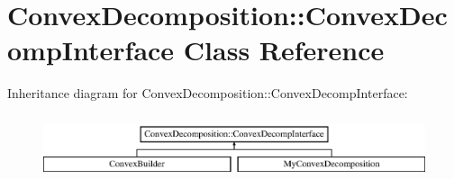 \hypertarget{class_convex_decomposition_1_1_convex_decomp_interface}{\section{Convex\-Decomposition\-:\-:Convex\-Decomp\-Interface Class Reference}
\label{class_convex_decomposition_1_1_convex_decomp_interface}
}
Inheritance diagram for Convex\-Decomposition\-:\-:Convex\-Decomp\-Interface\-:\begin{figure}[H]
\begin{center}
\leavevmode
\includegraphics[height=1.931034cm]{class_convex_decomposition_1_1_convex_decomp_interface}
\end{center}
\end{figure}
